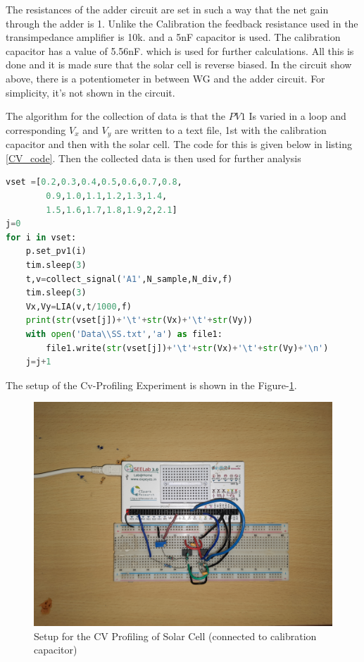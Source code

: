 \documentclass{article}
\begin{document}
\begin{multicols}{2}
The resistances of the adder circuit are set in such a way that the net gain through the adder is 1. Unlike the Calibration the feedback resistance used in the transimpedance amplifier is 10k. and a 5nF capacitor is used. The calibration capacitor has a value of 5.56nF. which is used for further calculations. All this is done and it is made sure that the solar cell is reverse biased. In the circuit show above, there is a potentiometer in between WG and the adder circuit. For simplicity, it's not shown in the circuit.

The algorithm for the collection of data is that the $PV1$ Is varied in a loop and corresponding $V_x$  and $V_y$ are written to a text file, 1st with the calibration capacitor and then with the solar cell. The code for this is given below in listing \ref{CV_code}. Then the collected data is then used for further analysis

\begin{lstlisting}[language=Python, caption=Collecting the data as arrays for the CV-Profiling\cite{python},label=CV_code]
vset =[0.2,0.3,0.4,0.5,0.6,0.7,0.8,
        0.9,1.0,1.1,1.2,1.3,1.4,
        1.5,1.6,1.7,1.8,1.9,2,2.1]
j=0
for i in vset:
    p.set_pv1(i)
    tim.sleep(3)
    t,v=collect_signal('A1',N_sample,N_div,f)
    tim.sleep(3)
    Vx,Vy=LIA(v,t/1000,f)
    print(str(vset[j])+'\t'+str(Vx)+'\t'+str(Vy))
    with open('Data\\SS.txt','a') as file1:
        file1.write(str(vset[j])+'\t'+str(Vx)+'\t'+str(Vy)+'\n')
    j=j+1
\end{lstlisting}



The setup of the Cv-Profiling Experiment is shown in the Figure-\ref{CV_setup}.
\begin{figure}[H]
    \centering
    \includegraphics[width=0.6\columnwidth]{Images/CV_setup.jpg}
    \caption{Setup for the CV Profiling of Solar Cell (connected to calibration capacitor)}
    \label{CV_setup}
\end{figure}





\end{multicols}
\end{document}
